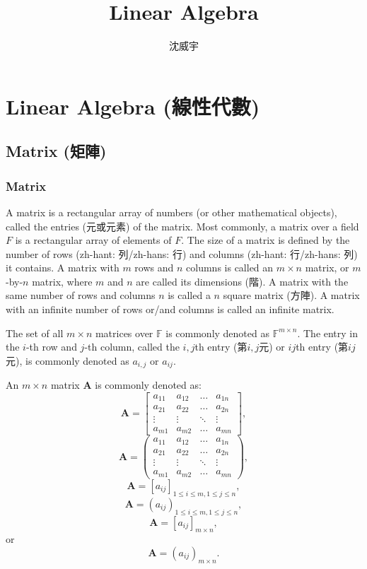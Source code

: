 \documentclass[a4paper,12pt]{report}
\begin{document}
\title{Linear Algebra}
\author{沈威宇}
\date{\temtoday}
\titletocdoc
\chapter{Linear Algebra (線性代數)}
\section{Matrix (矩陣)}
\subsection{Matrix}
A matrix is a rectangular array of numbers (or other mathematical objects), called the entries (元或元素) of the matrix. Most commonly, a matrix over a field $F$ is a rectangular array of elements of $F$.
The size of a matrix is defined by the number of rows (zh-hant: 列/zh-hans: 行) and columns (zh-hant: 行/zh-hans: 列) it contains. A matrix with $m$ rows and $n$ columns is called an $m\times n$ matrix, or $m$-by-$n$ matrix, where $m$ and $n$ are called its dimensions (階). A matrix with the same number of rows and columns $n$ is called a $n$ square matrix (方陣). A matrix with an infinite number of rows or/and columns is called an infinite matrix.

The set of all $m\times n$ matrices over $\mathbb{F}$ is commonly denoted as $\mathbb{F}^{m\times n}$.
The entry in the $i$-th row and $j$-th column, called the $i,j$th entry (第$i,j$元) or $ij$th entry (第$ij$元), is commonly denoted as $a_{i,j}$ or $a_{ij}$.

An $m\times n$ matrix $\mathbf{A}$ is commonly denoted as:
\[\mathbf{A}=\begin{bmatrix}a_{11} & a_{12} & \ldots & a_{1n}\\a_{21} & a_{22} & \ldots & a_{2n}\\\vdots & \vdots & \ddots & \vdots\\a_{m1} & a_{m2} & \ldots & a_{mn}\end{bmatrix},\]
\[\mathbf{A}=\begin{pmatrix}a_{11} & a_{12} & \ldots & a_{1n}\\a_{21} & a_{22} & \ldots & a_{2n}\\\vdots & \vdots & \ddots & \vdots\\a_{m1} & a_{m2} & \ldots & a_{mn}\end{pmatrix},\]
\[\mathbf{A}=[a_{ij}]_{1\leq i\leq m,1\leq j\leq n},\]
\[\mathbf{A}=(a_{ij})_{1\leq i\leq m,1\leq j\leq n},\]
\[\mathbf{A}=[a_{ij}]_{m\times n},\]
or
\[\mathbf{A}=(a_{ij})_{m\times n}.\]
\end{document}
